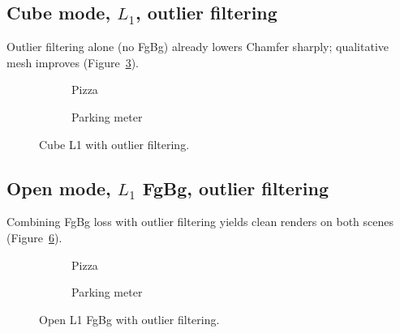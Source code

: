 \documentclass{report}
\begin{document}
\subsection{Cube mode, $L_1$, outlier filtering}
\label{subsec:ablation_cube_l1_outliers}

Outlier filtering alone (no FgBg) already lowers Chamfer sharply; qualitative mesh improves (Figure~\ref{fig:ablation_cube_l1_out}).

\begin{figure}[H]
    \centering
    \begin{subfigure}{\textwidth}
        \centering
        \caption{Pizza}
        \label{fig:ablation_cube_l1_out_pizza}
    \end{subfigure}
    \vspace{0.6em}
    \begin{subfigure}{\textwidth}
        \centering
        \caption{Parking meter}
        \label{fig:ablation_cube_l1_out_parking}
    \end{subfigure}
    \caption{Cube L1 with outlier filtering.}
    \label{fig:ablation_cube_l1_out}
\end{figure}

\subsection{Open mode, $L_1$ FgBg, outlier filtering}
\label{subsec:ablation_open_l1_fgbg_outliers}

Combining FgBg loss with outlier filtering yields clean renders on both scenes (Figure~\ref{fig:ablation_open_l1_fgbg_out}).

\begin{figure}[H]
    \centering
    \begin{subfigure}{\textwidth}
        \centering
        \caption{Pizza}
        \label{fig:ablation_open_l1_fgbg_out_pizza}
    \end{subfigure}
    \vspace{0.6em}
    \begin{subfigure}{\textwidth}
        \centering
        \caption{Parking meter}
        \label{fig:ablation_open_l1_fgbg_out_parking}
    \end{subfigure}
    \caption{Open L1 FgBg with outlier filtering.}
    \label{fig:ablation_open_l1_fgbg_out}
\end{figure}
\end{document}

